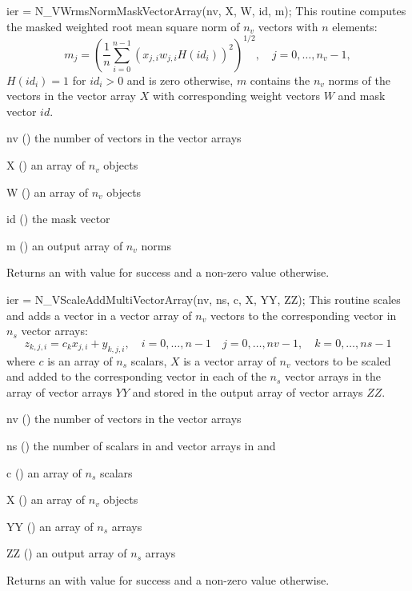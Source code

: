 {
  ier = N\_VWrmsNormMaskVectorArray(nv, X, W, id, m);
}
{
  This routine computes the masked weighted root mean square norm of $n_v$
  vectors with $n$ elements:
  \begin{equation*}
    m_j = \left( \frac1n \sum_{i=0}^{n-1} \left(x_{j,i} w_{j,i}
    H(id_i)\right)^2 \right)^{1/2}, \quad j=0,\ldots,n_v-1,
  \end{equation*}
  $H(id_i)=1$ for $id_i > 0$ and is zero otherwise, $m$ contains the $n_v$
  norms of the vectors in the vector array $X$ with corresponding weight
  vectors $W$ and mask vector $id$.
}
{
  \begin{args}[nv]
  \item[nv] () the number of vectors in the vector arrays
  \item[X] () an array of $n_v$ {\nvector} objects
  \item[W] () an array of $n_v$ {\nvector} objects
  \item[id] () the mask vector
  \item[m] () an output array of $n_v$ norms
  \end{args}
}
{
  Returns an  with value  for success and a non-zero value otherwise.
}
{}

{
  ier = N\_VScaleAddMultiVectorArray(nv, ns, c, X, YY, ZZ);
}
{
  This routine scales and adds a vector in a vector array of $n_v$ vectors to
  the corresponding vector in $n_s$ vector arrays:
  \begin{equation*}
    z_{k,j,i} = c_k x_{j,i} + y_{k,j,i}, \quad i=0,\ldots,n-1 \quad j=0,\ldots,nv-1, \quad k=0,\ldots,ns-1
  \end{equation*}
  where $c$ is an array of $n_s$ scalars, $X$ is a vector array of $n_v$ vectors
  to be scaled and added to the corresponding vector in each of the $n_s$ vector
  arrays in the array of vector arrays $YY$ and stored in the output array of vector
  arrays $ZZ$.
}
{
  \begin{args}[nv]
  \item[nv] () the number of vectors in the vector arrays
  \item[ns] () the number of scalars in  and vector arrays
    in  and 
  \item[c] () an array of $n_s$ scalars
  \item[X] () an array of $n_v$ {\nvector} objects
  \item[YY] () an array of $n_s$ {\nvector} arrays
  \item[ZZ] () an output array of $n_s$ {\nvector}
    arrays
  \end{args}
}
{
  Returns an  with value  for success and a non-zero value otherwise.
}
{}

